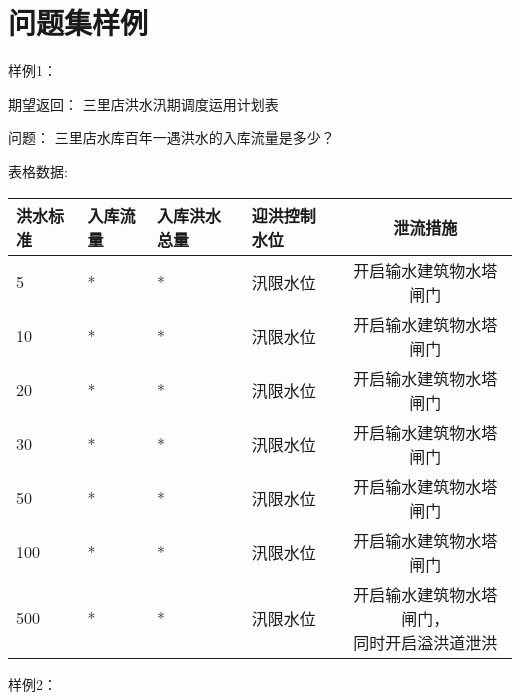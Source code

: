 \chapter{问题集样例}
\label{cha:问题集样例}



样例1：

期望返回： 
三里店洪水汛期调度运用计划表

问题：
三里店水库百年一遇洪水的入库流量是多少？

表格数据:

\begin{table}[htbp]
    \centering
    \begin{tabular}{llllc}
    \toprule
    \textbf{洪水标准} & \textbf{入库流量} & \textbf{入库洪水总量} & \textbf{迎洪控制水位} & \textbf{泄流措施} \\
    \midrule
    5 & * & * & 汛限水位 & 开启输水建筑物水塔闸门 \\
    10 & * & * & 汛限水位 & 开启输水建筑物水塔闸门 \\
    20 & * & * & 汛限水位 & 开启输水建筑物水塔闸门 \\
    30 & * & * & 汛限水位 & 开启输水建筑物水塔闸门 \\
    50 & * & * & 汛限水位 & 开启输水建筑物水塔闸门 \\
    100 & * & * & 汛限水位 & 开启输水建筑物水塔闸门 \\
    500 & * & * & 汛限水位 & \makecell{开启输水建筑物水塔闸门，\\同时开启溢洪道泄洪} \\
    \bottomrule
    \end{tabular}
\end{table}
\newpage
样例2：

